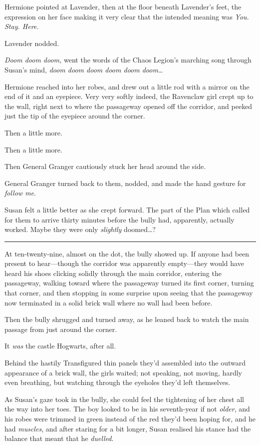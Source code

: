 Hermione pointed at Lavender, then at the floor beneath Lavender's feet,
the expression on her face making it very clear that the intended
meaning was \emph{You. Stay. Here.}

Lavender nodded.

\emph{Doom doom doom,} went the words of the Chaos Legion's marching
song through Susan's mind, \emph{doom doom doom doom doom doom}\ldots{}

Hermione reached into her robes, and drew out a little rod with a mirror
on the end of it and an eyepiece. Very very softly indeed, the Ravenclaw
girl crept up to the wall, right next to where the passageway opened off
the corridor, and peeked just the tip of the eyepiece around the corner.

Then a little more.

Then a little more.

Then General Granger cautiously stuck her head around the side.

General Granger turned back to them, nodded, and made the hand gesture
for \emph{follow me}.

Susan felt a little better as she crept forward. The part of the Plan
which called for them to arrive thirty minutes before the bully had,
apparently, actually worked. Maybe they were only \emph{slightly}
doomed\ldots{}?

\begin{center}\rule{3in}{0.4pt}\end{center}

At ten-twenty-nine, almost on the dot, the bully showed up. If anyone
had been present to hear---though the corridor was apparently
empty---they would have heard his shoes clicking solidly through the
main corridor, entering the passageway, walking toward where the
passageway turned its first corner, turning that corner, and then
stopping in some surprise upon seeing that the passageway now terminated
in a solid brick wall where no wall had been before.

Then the bully shrugged and turned away, as he leaned back to watch the
main passage from just around the corner.

It \emph{was} the castle Hogwarts, after all.

Behind the hastily Transfigured thin panels they'd assembled into the
outward appearance of a brick wall, the girls waited; not speaking, not
moving, hardly even breathing, but watching through the eyeholes they'd
left themselves.

As Susan's gaze took in the bully, she could feel the tightening of her
chest all the way into her toes. The boy looked to be in his
seventh-year if not \emph{older}, and his robes were trimmed in green
instead of the red they'd been hoping for, and he had \emph{muscles},
and after staring for a bit longer, Susan realised his stance had the
balance that meant that he \emph{duelled}.

